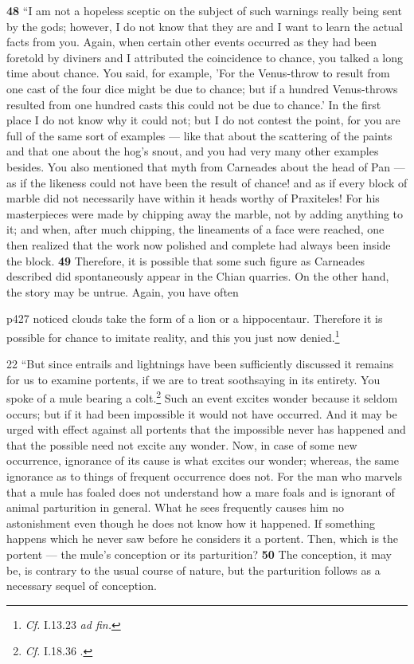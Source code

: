 \textbf{48} ``I am not a hopeless sceptic on the subject of such warnings really being sent by the gods; however, I do not know that they are and I want to learn the actual facts from you. Again, when certain other events occurred as they had been foretold by diviners and I attributed the coincidence to chance, you talked a long time about chance. You said, for example, 'For the Venus-throw to result from one cast of the four dice might be due to chance; but if a hundred Venus-throws resulted from one hundred casts this could not be due to chance.'\texthebrew{} In the first place I do not know why it could not; but I do not contest the point, for you are full of the same sort of examples \texthebrew{—} like that about the scattering of the paints and that one about the hog's snout,\texthebrew{} and you had very many other examples besides. You also mentioned that myth from Carneades about the head of Pan\texthebrew{ —} as if the likeness could not have been the result of chance! and as if every block of marble did not necessarily have within it heads worthy of Praxiteles! For his masterpieces were made by chipping away the marble, not by adding anything to it; and when, after much chipping, the lineaments of a face were reached, one then realized that the work now polished and complete had always been inside the block. \textbf{49} Therefore, it is possible that some such figure as Carneades described did spontaneously appear in the Chian quarries. On the other hand, the story may be untrue. Again, you have often

p427 noticed clouds take the form of a lion or a hippocentaur. Therefore it is possible for chance to imitate reality, and this you just now denied.\footnote{\emph{Cf.}
I.13.23 \emph{ad fin.}

}

22
``But since entrails and lightnings have been sufficiently discussed it remains for us to examine portents, if we are to treat soothsaying in its entirety. You spoke of a mule bearing a colt.\texthebrew{}\footnote{\emph{Cf.}
I.18.36 .

} Such an event excites wonder because it seldom occurs; but if it had been impossible it would not have occurred. And it may be urged with effect against all portents that the impossible never has happened and that the possible need not excite any wonder. Now, in case of some new occurrence, ignorance of its cause is what excites our wonder; whereas, the same ignorance as to things of frequent occurrence does not. For the man who marvels that a mule has foaled does not understand how a mare foals and is ignorant of animal parturition in general. What he sees frequently causes him no astonishment even though he does not know how it happened. If something happens which he never saw before he considers it a portent. Then, which is the portent \texthebrew{—} the mule's conception or its parturition? \textbf{50} The conception, it may be, is contrary to the usual course of nature, but the parturition follows as a necessary sequel of conception.

